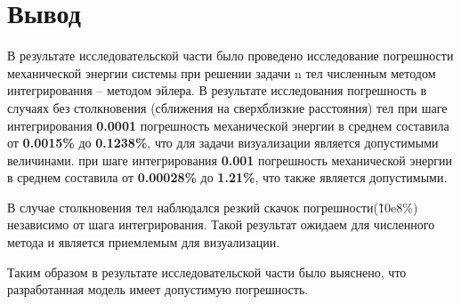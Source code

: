 \section{Вывод}

В результате исследовательской части было проведено исследование погрешности механической энергии системы при решении задачи n тел численным методом интегрирования -- методом эйлера. В результате исследования погрешность в случаях без столкновения (сближения на сверхблизкие расстояния) тел при шаге интегрирования \textbf{0.0001} погрешность механической энергии в среднем составила от \textbf{0.0015\%} до \textbf{0.1238\%}, что для задачи визуализации является допустимыми величинами. при шаге интегрирования \textbf{0.001} погрешность механической энергии в среднем составила от \textbf{0.00028\%} до \textbf{1.21\%}, что также является допустимыми.

В случае столкновения тел наблюдался резкий скачок погрешности(\~10e8\%) независимо от шага интегрирования. Такой результат ожидаем для численного метода и является приемлемым для визуализации.

Таким образом в результате исследовательской части было выяснено, что разработанная модель имеет допустимую погрешность.


\clearpage
